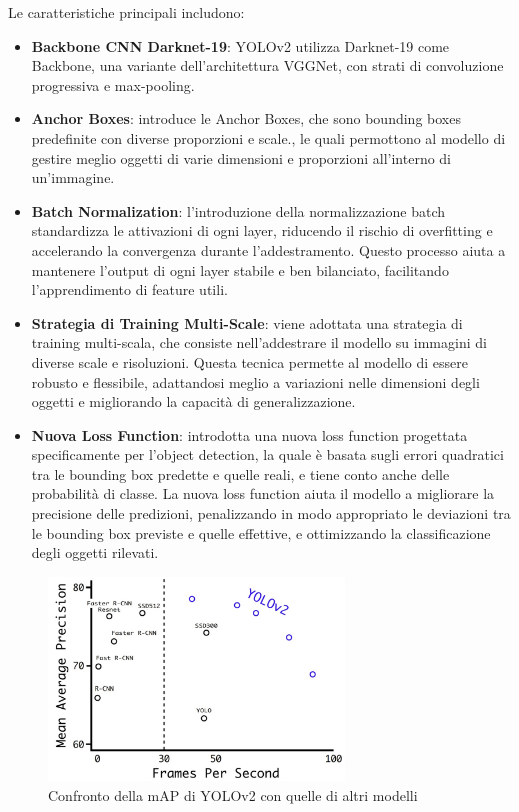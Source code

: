 Le caratteristiche principali includono:
\begin{itemize}
  \item \textbf{Backbone CNN Darknet-19}: YOLOv2 utilizza Darknet-19 come Backbone, una variante dell'architettura VGGNet, con strati di convoluzione progressiva e max-pooling.
  \item \textbf{Anchor Boxes}: introduce le Anchor Boxes, che sono bounding boxes predefinite con diverse proporzioni e scale., le quali permottono al modello di gestire meglio oggetti di varie dimensioni e proporzioni all'interno di un'immagine.
  \item \textbf{Batch Normalization}: l'introduzione della normalizzazione batch standardizza le attivazioni di ogni layer, riducendo il rischio di overfitting e accelerando la convergenza durante l'addestramento. Questo processo aiuta a mantenere l'output di ogni layer stabile e ben bilanciato, facilitando l'apprendimento di feature utili.
  \item \textbf{Strategia di Training Multi-Scale}: viene adottata una strategia di training multi-scala, che consiste nell'addestrare il modello su immagini di diverse scale e risoluzioni. Questa tecnica permette al modello di essere robusto e flessibile, adattandosi meglio a variazioni nelle dimensioni degli oggetti e migliorando la capacità di generalizzazione.
  \item \textbf{Nuova Loss Function}: introdotta una nuova loss function progettata specificamente per l'object detection, la quale è basata sugli errori quadratici tra le bounding box predette e quelle reali, e tiene conto anche delle probabilità di classe. La nuova loss function aiuta il modello a migliorare la precisione delle predizioni, penalizzando in modo appropriato le deviazioni tra le bounding box previste e quelle effettive, e ottimizzando la classificazione degli oggetti rilevati.
\end{itemize}

\begin{figure}[ht]
    \centering
    \includegraphics[width=0.7\textwidth]{files/capitoli/2-yolo/assets/yolov2-benchmark.jpeg}
    \caption{\label{fig:yolov2-benchmark}Confronto della mAP di YOLOv2 con quelle di altri modelli\cite{19}}
\end{figure}

